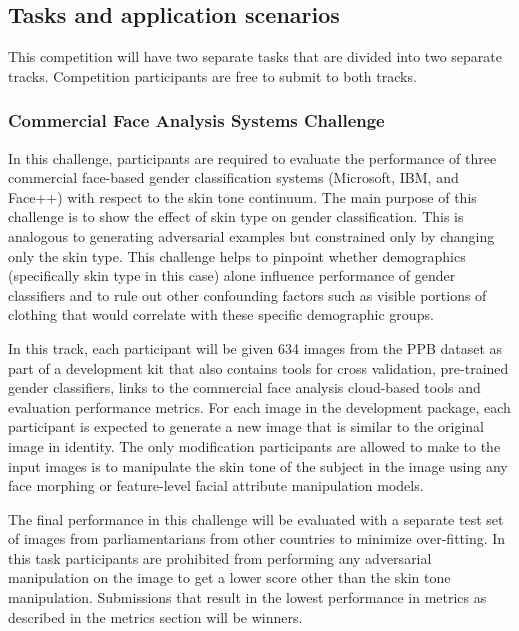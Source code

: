 \documentclass[11pt, oneside]{article}
\begin{document}
\subsection{Tasks and application scenarios}


This competition will have two separate tasks that are divided into two 
separate tracks. Competition participants are free to submit to both tracks.

\subsubsection{Commercial Face Analysis Systems Challenge}
In this challenge, participants are required to evaluate the performance of 
three commercial face-based gender classification systems (Microsoft, IBM, and 
Face++) with respect to the skin tone continuum. The main purpose of this 
challenge is to show the effect of skin type on gender classification. This is 
analogous to generating adversarial examples but constrained only by changing 
only the skin type. This challenge helps to pinpoint whether demographics 
(specifically skin type in this case) alone influence performance of gender 
classifiers and to rule out other confounding factors such as visible portions 
of clothing that would correlate with these specific demographic groups.

In this track, each participant will be given 634 images from the PPB dataset 
as part of a development kit that also contains tools for cross validation, 
pre-trained gender classifiers, links to the commercial face analysis 
cloud-based tools and evaluation performance metrics. For each image in the 
development package, each participant is expected to generate a new image that is 
similar to the original image in identity. The only modification participants 
are allowed to make to the input images is to manipulate the skin tone of the 
subject in the image using any face morphing or feature-level facial attribute 
manipulation models.

The final performance in this challenge will be evaluated with a separate test 
set of images from parliamentarians from other countries to minimize 
over-fitting. In this task participants are prohibited from performing any 
adversarial manipulation on the image to get a lower score other than the skin 
tone manipulation. Submissions that result in the lowest performance in metrics 
as described in the metrics section will be winners.
\end{document}
